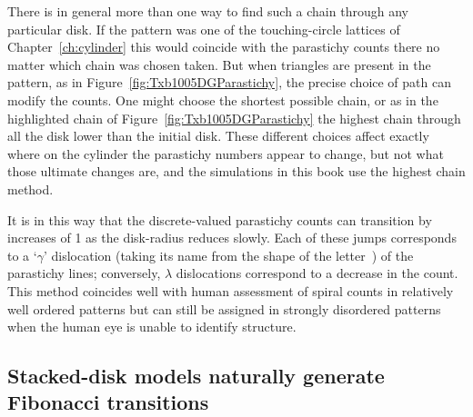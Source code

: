 %
There is in general more than one way to find such a chain through any particular disk. If the pattern was one of the touching-circle lattices of Chapter~\ref{ch:cylinder} this would coincide with the parastichy counts there no matter which chain was chosen taken. But when triangles are present in the pattern, as in Figure~\ref{fig:Txb1005DGParastichy}, the precise choice of path can modify the counts. One might choose the shortest possible chain, or as in the highlighted chain of Figure~\ref{fig:Txb1005DGParastichy} the highest chain through all the disk lower than the initial disk. These different choices affect exactly where on the cylinder the parastichy numbers appear to change, but not what those ultimate changes are, and the simulations in this book use the highest chain method. 

It is in this way that the discrete-valued parastichy counts can transition by increases of 1 as the disk-radius reduces slowly. 
	 Each of these jumps corresponds to a `$\gamma$' dislocation (taking its name from the shape of the letter~\cite{zagorska-marekPhyllotacticPatternsTransitions1985}) of the parastichy lines; conversely, $\lambda$ dislocations correspond to a decrease in the count.
This method coincides well with human assessment of spiral counts in relatively well ordered patterns but can still be assigned in strongly disordered patterns when the human eye is unable to identify structure. 


\subsection{Stacked-disk models naturally generate Fibonacci transitions}



